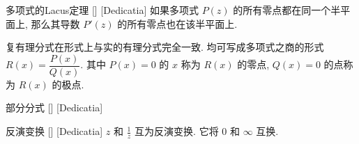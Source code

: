 \documentclass[UTF8]{ctexart}
\begin{document}
        \begin{thm}
            [UUID]
            {多项式的Lacus定理}
            []
            [Dedicatia]
            如果多项式 \(P(z)\) 的所有零点都在同一个半平面上, 那么其导数 \(P'(z)\) 的所有零点也在该半平面上. 
        \end{thm}

        复有理分式在形式上与实的有理分式完全一致. 均可写成多项式之商的形式 \(R(x)=\dfrac{P(x)}{Q(x)}\). 其中 \(P(x)=0\) 的 \(x\) 称为 \(R(x)\) 的零点,  \(Q(x)=0\) 的点称为 \(R(x)\) 的极点. 

        \begin{dfn}
            [UUID]
            {部分分式}
            []
            [Dedicatia]
        \end{dfn}

        \begin{dfn}
            [UUID]
            {反演变换}
            []
            [Dedicatia]
            \(z\) 和 \(\frac{1}{z}\) 互为反演变换. 它将 \(0\) 和 \(\infty\) 互换. 
        \end{dfn}





\end{document}

